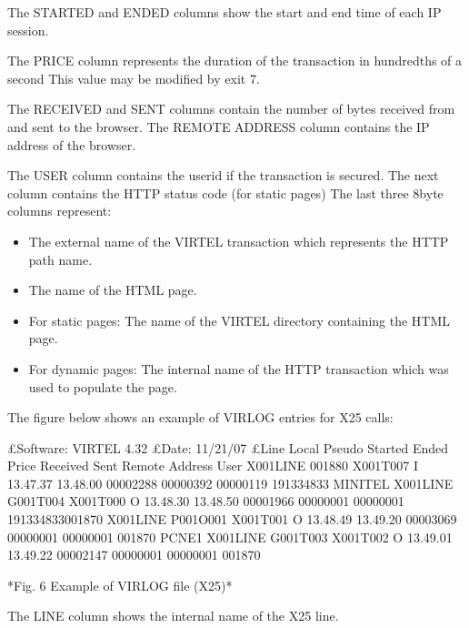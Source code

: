 \documentclass[letterpaper,10pt,english]{sphinxmanual}
\begin{document}
\sphinxAtStartPar
The STARTED and ENDED columns show the start and end time of each IP session.

\sphinxAtStartPar
The PRICE column represents the duration of the transaction in hundredths of a second This value may be modified by exit 7.

\sphinxAtStartPar
The RECEIVED and SENT columns contain the number of bytes received from and sent to the browser. The REMOTE ADDRESS column contains the IP address of the browser.

\sphinxAtStartPar
The USER column contains the userid if the transaction is secured.
The next column contains the HTTP status code (for static pages) The last three 8\sphinxhyphen{}byte columns represent:
\begin{itemize}
\item {} 
\sphinxAtStartPar
The external name of the VIRTEL transaction which represents the HTTP path name.

\item {} 
\sphinxAtStartPar
The name of the HTML page.

\item {} 
\sphinxAtStartPar
For static pages: The name of the VIRTEL directory containing the HTML page.

\item {} 
\sphinxAtStartPar
For dynamic pages: The internal name of the HTTP transaction which was used to populate the page.

\end{itemize}

\sphinxAtStartPar
The figure below shows an example of VIRLOG entries for X25 calls:

\begin{sphinxVerbatim}[commandchars=\\\{\}]
£Software: VIRTEL 4.32
£Date: 11/21/07
£Line Local Pseudo Started Ended Price Received Sent Remote Address User
X001LINE 001880 X001T007 I 13.47.37 13.48.00 00002288 00000392 00000119 191334833 MINITEL
X001LINE G001T004 X001T000 O 13.48.30 13.48.50 00001966 00000001 00000001 191334833001870
X001LINE P001O001 X001T001 O 13.48.49 13.49.20 00003069 00000001 00000001 001870 PCNE1
X001LINE G001T003 X001T002 O 13.49.01 13.49.22 00002147 00000001 00000001 001870

*Fig. 6 Example of VIRLOG file (X25)*
\end{sphinxVerbatim}

\sphinxAtStartPar
The LINE column shows the internal name of the X25 line.
\end{document}
